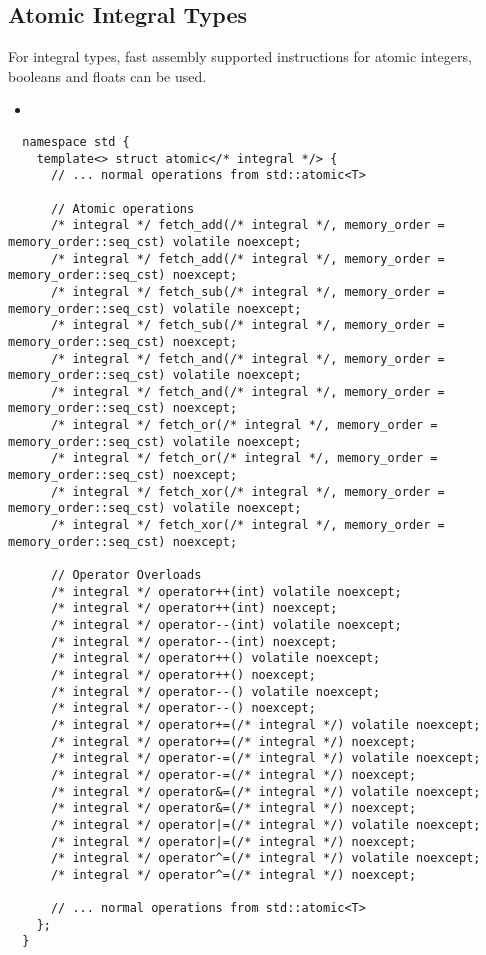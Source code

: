 \subsection{Atomic Integral Types}
For integral types, fast assembly supported instructions for atomic integers, booleans and floats can be used.
\begin{itemize}
  \item 
\end{itemize}
\begin{verbatim}
  namespace std {
    template<> struct atomic</* integral */> {
      // ... normal operations from std::atomic<T>

      // Atomic operations
      /* integral */ fetch_add(/* integral */, memory_order = memory_order::seq_cst) volatile noexcept;
      /* integral */ fetch_add(/* integral */, memory_order = memory_order::seq_cst) noexcept;
      /* integral */ fetch_sub(/* integral */, memory_order = memory_order::seq_cst) volatile noexcept;
      /* integral */ fetch_sub(/* integral */, memory_order = memory_order::seq_cst) noexcept;
      /* integral */ fetch_and(/* integral */, memory_order = memory_order::seq_cst) volatile noexcept;
      /* integral */ fetch_and(/* integral */, memory_order = memory_order::seq_cst) noexcept;
      /* integral */ fetch_or(/* integral */, memory_order = memory_order::seq_cst) volatile noexcept;
      /* integral */ fetch_or(/* integral */, memory_order = memory_order::seq_cst) noexcept;
      /* integral */ fetch_xor(/* integral */, memory_order = memory_order::seq_cst) volatile noexcept;
      /* integral */ fetch_xor(/* integral */, memory_order = memory_order::seq_cst) noexcept;

      // Operator Overloads
      /* integral */ operator++(int) volatile noexcept;
      /* integral */ operator++(int) noexcept;
      /* integral */ operator--(int) volatile noexcept;
      /* integral */ operator--(int) noexcept;
      /* integral */ operator++() volatile noexcept;
      /* integral */ operator++() noexcept;
      /* integral */ operator--() volatile noexcept;
      /* integral */ operator--() noexcept;
      /* integral */ operator+=(/* integral */) volatile noexcept;
      /* integral */ operator+=(/* integral */) noexcept;
      /* integral */ operator-=(/* integral */) volatile noexcept;
      /* integral */ operator-=(/* integral */) noexcept;
      /* integral */ operator&=(/* integral */) volatile noexcept;
      /* integral */ operator&=(/* integral */) noexcept;
      /* integral */ operator|=(/* integral */) volatile noexcept;
      /* integral */ operator|=(/* integral */) noexcept;
      /* integral */ operator^=(/* integral */) volatile noexcept;
      /* integral */ operator^=(/* integral */) noexcept;

      // ... normal operations from std::atomic<T>
    };
  }
\end{verbatim}
